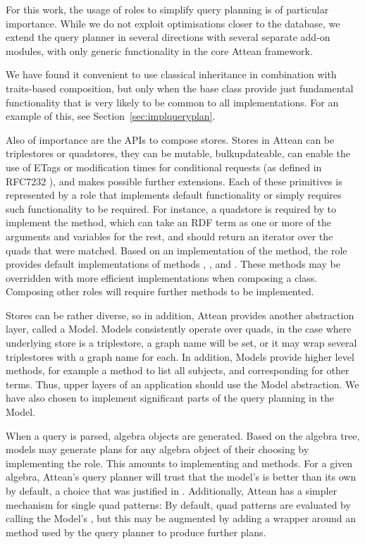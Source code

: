 For this work, the usage of roles to simplify query planning is of
particular importance. While we do not exploit optimisations closer to
the database, we extend the query planner in several directions with
several separate add-on modules, with only generic functionality in
the core Attean framework.

We have found it convenient to use classical inheritance in
combination with traits-based composition, but only when the base
class provide just fundamental functionality that is very likely to be
common to all implementations. For an example of this, see
Section~\ref{sec:implqueryplan}.

Also of importance are the APIs to compose stores. Stores in Attean
can be triplestores or quadstores, they can be mutable,
bulkupdateable, can enable the use of ETags or modification times for
conditional requests (as defined in RFC7232 \cite{rfc7234}), and makes
possible further extensions. Each of these primitives is represented
by a role that implements default functionality or simply requires
such functionality to be required. For instance, a quadstore is
required by  to implement the
 method, which can take an RDF term as one or more
of the arguments and variables for the rest, and should return an
iterator over the quads that were matched. Based on an implementation
of the  method, the 
role provides default implementations of methods ,
,  and
. These methods may be overridden with more efficient
implementations when composing a class. Composing other roles will
require further methods to be implemented.

Stores can be rather diverse, so in addition, Attean provides another
abstraction layer, called a Model. Models consistently operate over
quads, in the case where underlying store is a triplestore, a graph
name will be set, or it may wrap several triplestores with a graph
name for each. In addition, Models provide higher level methods,
for example a  method to list all subjects, and
corresponding for other terms. Thus, upper layers of an application
should use the Model abstraction. We have also chosen to implement significant
parts of the query planning in the Model.

When a query is parsed, algebra objects are generated. Based on the
algebra tree, models may generate plans for any algebra object of
their choosing by implementing the 
role. This amounts to implementing  and
 methods. For a given algebra, Attean's query
planner will trust that the model's  is
better than its own by default, a choice that was justified in
\cite{williamspushing}. Additionally, Attean has a simpler mechanism
for single quad patterns: By default, quad patterns are evaluated by
calling the Model's , but this may be augmented by
adding a wrapper around an  method used by the
query planner to produce further plans.

